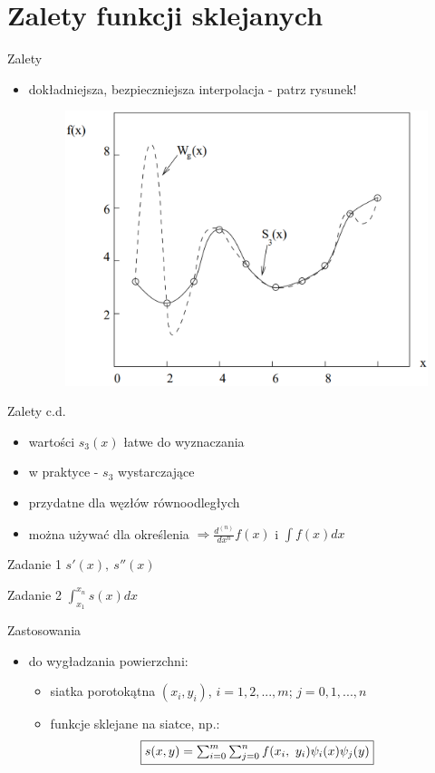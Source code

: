 \section{Zalety funkcji sklejanych}
\begin{frame}{Zalety}
	\begin{itemize}
	\item dokładniejsza, bezpieczniejsza interpolacja - patrz rysunek!
    \begin{figure}[h]
			\includegraphics[width=.75\linewidth]{img/4/spline_img_5}
		\end{figure}
	\end{itemize}
\end{frame}
\begin{frame}{Zalety c.d.}
	\begin{itemize}
		\item wartości $s_{3}(x)$ łatwe do wyznaczania
    	\item w praktyce - $s_{3}$ wystarczające
    	\item przydatne dla węzłów równoodległych
    	\item można używać dla określenia $\Rightarrow \frac{d^{(n)}}	
        	{dx^{n}}f(x)$
    		i $\int f(x)dx$ 
	\end{itemize}
	\begin{block}{Zadanie 1}
        	$s'(x), \ s''(x)$
    \end{block}
    \begin{block}{Zadanie 2}
        	$\int^{x_{n}}_{x_{1}}s(x)dx$
    \end{block}
\end{frame}
\begin{frame}{Zastosowania}
	\begin{itemize}
		\item do wygładzania powierzchni:
        	\begin{itemize}
        		\item siatka porotokątna $(x_{i},y_{i})$, $i=1,2,...,m$; 
                	$j=0,1,...,n$
                \item funkcje sklejane na siatce, np.: 
                \[
                	\framebox{$s(x,y)=\sum_{i=0}^{m}\sum_{j=0}^{n}f(x_{i},
                    \ y_{i})\psi_{i}(x)\psi_{j}(y)$}
                \]
        	\end{itemize}
	\end{itemize}
\end{frame}







